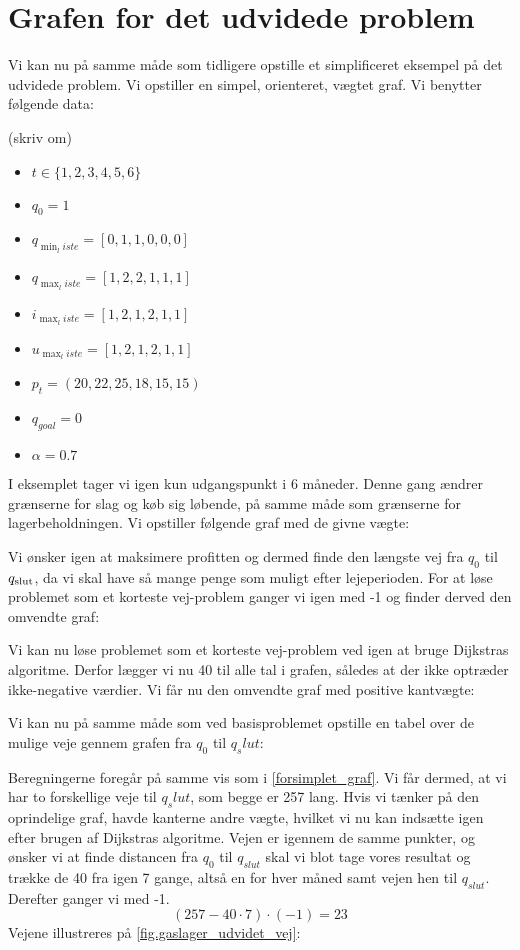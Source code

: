 \section{Grafen for det udvidede problem}
Vi kan nu på samme måde som tidligere opstille et simplificeret eksempel på det udvidede problem. Vi opstiller en simpel, orienteret, vægtet graf. Vi benytter følgende data:

(skriv om)
\begin{itemize}
  \item $t \in \{1,2,3,4,5,6\}$
  \item $q_{0}=1$
  \item $q_{\min_liste}=[0,1,1,0,0,0]$
  \item $q_{\max_liste}=[1,2,2,1,1,1]$
  \item $i_{\max_liste}=[1,2,1,2,1,1]$
  \item $u_{\max_liste}=[1,2,1,2,1,1]$
  \item $p_{t}=(20,22,25,18,15,15)$
  \item $q_{goal}=0$
  \item $\alpha=0.7$
\end{itemize}

I eksemplet tager vi igen kun udgangspunkt i 6 måneder. Denne gang ændrer grænserne for slag og køb sig løbende, på samme måde som grænserne for lagerbeholdningen. Vi opstiller følgende graf med de givne vægte:



Vi ønsker igen at maksimere profitten og dermed finde den længste vej fra $q_{0}$ til $q_{\textrm{slut}}$, da vi skal have så mange penge som muligt efter lejeperioden. For at løse problemet som et korteste vej-problem ganger vi igen med -1 og finder derved den omvendte graf:



Vi kan nu løse problemet som et korteste vej-problem ved igen at bruge Dijkstras algoritme. Derfor lægger vi nu 40 til alle tal i grafen, således at der ikke optræder ikke-negative værdier. Vi får nu den omvendte graf med positive kantvægte:




Vi kan nu på samme måde som ved basisproblemet opstille en tabel over de mulige veje gennem grafen fra $q_0$ til $q_slut$:

 


Beregningerne foregår på samme vis som i \autoref{forsimplet_graf}. Vi får dermed, at vi har to forskellige veje til $q_slut$, som begge er 257 lang. Hvis vi tænker på den oprindelige graf, havde kanterne andre vægte, hvilket vi nu kan indsætte igen efter brugen af Dijkstras algoritme. Vejen er igennem de samme punkter, og ønsker vi at finde distancen fra $q_{0}$ til $q_{slut}$ skal vi blot tage vores resultat og trække de 40 fra igen 7 gange, altså en for hver måned samt vejen hen til $q_{slut}$. Derefter ganger vi med -1.
\begin{equation}
(257-40 \cdot 7) \cdot (-1) = 23
\end{equation}
Vejene illustreres på \autoref{fig.gaslager_udvidet_vej}:



